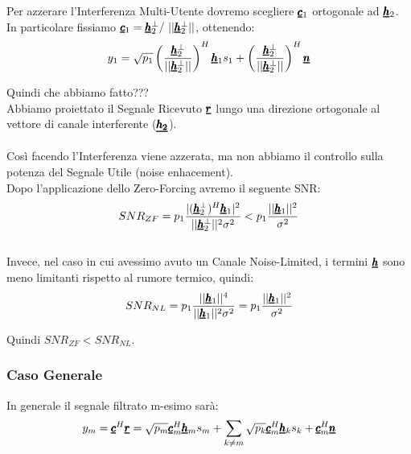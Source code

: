 Per azzerare l'Interferenza Multi-Utente dovremo scegliere $\pmb{\underline{c}}_1$ ortogonale ad $\pmb{\underline{h}}_2$.\\
In particolare fissiamo $\pmb{\underline{c}}_1 = \pmb{\underline{h}}_2^{\bot} / \ ||\pmb{\underline{h}}_2^{\bot}||$, ottenendo:
\begin{equation*}
    y_1 = \sqrt{p_1} \left(\frac{\pmb{\underline{h}}_2^{\bot}}{||\pmb{\underline{h}}_2^{\bot}||}  \right)^H \pmb{\underline{h}}_1 s_1 + \left(\frac{\pmb{\underline{h}}_2^{\bot}}{||\pmb{\underline{h}}_2^{\bot}||}  \right)^H \pmb{\underline{n}}
\end{equation*}

Quindi che abbiamo fatto???\\

Abbiamo proiettato il Segnale Ricevuto $\pmb{\underline{r}}$ lungo una direzione ortogonale al vettore di canale interferente ($\pmb{\underline{h_2}}$).\\ \\

Così facendo l'Interferenza viene azzerata, ma non abbiamo il controllo sulla potenza del Segnale Utile (noise enhacement).\\

Dopo l'applicazione dello Zero-Forcing avremo il seguente SNR:
\begin{equation*}
    SNR_{ZF} = p_1 \frac{|(\pmb{\underline{h}}_2^{\bot})^H \pmb{\underline{h}}_1 |^2}{||\pmb{\underline{h}}_2^{\bot}||^2 \sigma^2} < p_1 \frac{||\pmb{\underline{h}}_1||^2}{\sigma^2}
\end{equation*}
\\

Invece, nel caso in cui avessimo avuto un Canale Noise-Limited, i termini $\pmb{\underline{h}}$ sono meno limitanti rispetto al rumore termico, quindi:
\begin{equation*}
    SNR_{NL} = p_1 \frac{||\pmb{\underline{h}}_1||^4}{||\pmb{\underline{h}}_1||^2 \sigma^2} = p_1 \frac{||\pmb{\underline{h}}_1||^2}{\sigma^2}
\end{equation*}
\begin{center}
    Quindi $SNR_{ZF} < SNR_{NL}$.
\end{center}

\subsubsection{Caso Generale}
In generale il segnale filtrato m-esimo sarà:
\begin{equation*}
    y_m = \pmb{\underline{c}}^H \pmb{\underline{r}} = \sqrt{p_m}\pmb{\underline{c}}_m^H \pmb{\underline{h}}_m s_m + \sum_{k \neq m} \sqrt{p_k}\pmb{\underline{c}}_m^H \pmb{\underline{h}}_k s_k + \pmb{\underline{c}}_m^H \pmb{\underline{n}}
\end{equation*}

